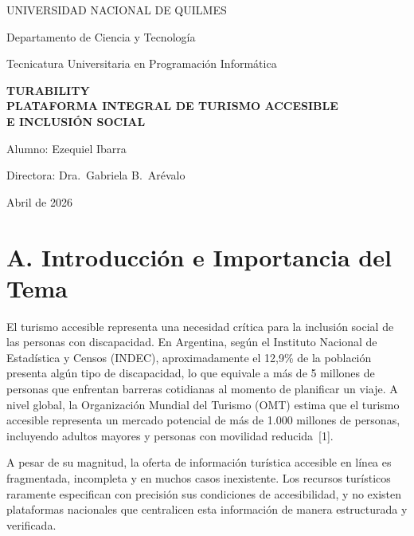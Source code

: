 \documentclass[12pt,a4paper]{article}
\begin{document}
\begin{titlepage}
\centering
\vspace*{1cm}

{\Large UNIVERSIDAD NACIONAL DE QUILMES}

\vspace{0.3cm}
{\large Departamento de Ciencia y Tecnología}

\vspace{0.3cm}
{\large Tecnicatura Universitaria en Programación Informática}

\vspace{2.5cm}

{\LARGE \textbf{TURABILITY}}\\[0.5cm]
{\large \textbf{PLATAFORMA INTEGRAL DE TURISMO ACCESIBLE}}\\[0.3cm]
{\large \textbf{E INCLUSIÓN SOCIAL}}

\vspace{2.5cm}

{\large Alumno: Ezequiel Ibarra}

\vspace{0.3cm}
{\large Directora: Dra.\ Gabriela B.\ Arévalo}

\vspace{2cm}

{\large Abril de 2026}

\end{titlepage}

\section*{A. Introducción e Importancia del Tema}

El turismo accesible representa una necesidad crítica para la inclusión social de las personas
con discapacidad. En Argentina, según el Instituto Nacional de Estadística y Censos (INDEC),
aproximadamente el 12{,}9\% de la población presenta algún tipo de discapacidad, lo que
equivale a más de 5 millones de personas que enfrentan barreras cotidianas al momento de
planificar un viaje. A nivel global, la Organización Mundial del Turismo (OMT) estima que el
turismo accesible representa un mercado potencial de más de 1.000 millones de personas,
incluyendo adultos mayores y personas con movilidad reducida~[1].

A pesar de su magnitud, la oferta de información turística accesible en línea es fragmentada,
incompleta y en muchos casos inexistente. Los recursos turísticos raramente especifican con
precisión sus condiciones de accesibilidad, y no existen plataformas nacionales que centralicen
esta información de manera estructurada y verificada.
\end{document}
